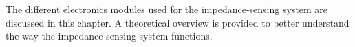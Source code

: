 The different electronics modules used for the impedance-sensing system are discussed in this chapter. A theoretical overview is provided to better understand the way the impedance-sensing system functions.